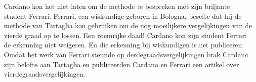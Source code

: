 Cardano kon het niet laten om de methode te bespreken met zijn briljante student Ferrari. Ferrari, een wiskundige geboren in Bologna, besefte dat hij de methode van Tartaglia kon gebruiken om de nog moeilijkere vergelijkingen van de vierde graad op te lossen. Een roemrijke daad! Cardano kon zijn student Ferrari de erkenning niet weigeren. En die erkenning bij wiskundigen is net publiceren. Omdat het werk van Ferrari steunde op derdegraadsvergelijkingen brak Cardano zijn belofte aan Tartaglia en publiceerden Cardano en Ferrari een artikel over vierdegraadsvergelijkingen.



















